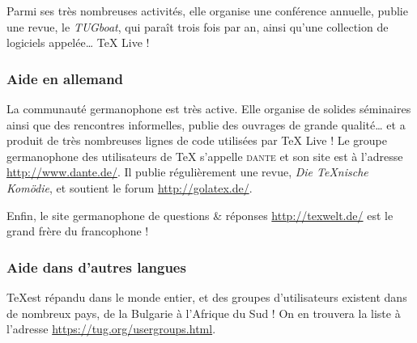 \documentclass[german, english, french]{article}
\renewcommand{\TL}{\TeX{} Live\xspace}%
\begin{document}
Parmi ses très nombreuses activités, elle organise une conférence annuelle,
publie une revue, le \emph{TUGboat}, qui paraît trois fois par an, ainsi qu'une
collection de logiciels appelée\dots{} \TL{} !

\subsubsection{Aide en allemand}
La communauté germanophone est très active. Elle organise de solides séminaires
ainsi que des rencontres informelles, publie des ouvrages de grande
qualité\dots{} et a produit de très nombreuses lignes de code utilisées par
\TL{} ! Le groupe germanophone des utilisateurs de \TeX{} s'appelle
\textsc{dante} et son site est à l'adresse \url{http://www.dante.de/}. Il publie
régulièrement une revue, \emph{Die TeXnische Komödie}, et soutient le forum
\url{http://golatex.de/}.

Enfin, le site germanophone de questions \& réponses \url{http://texwelt.de/}
est le grand frère du francophone  !

\subsubsection{Aide dans d'autres langues}
\TeX est répandu dans le monde entier, et des groupes d'utilisateurs existent
dans de nombreux pays, de la Bulgarie à l'Afrique du Sud ! On en trouvera la
liste à l'adresse \url{https://tug.org/usergroups.html}.
\end{document}
